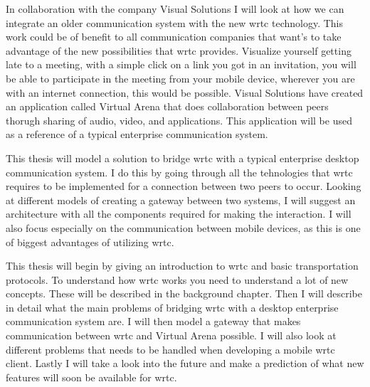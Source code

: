 In collaboration with the company Visual Solutions I will look at how we can integrate an older communication system with the new \gls{wrtc} technology. This work could be of benefit to all communication companies that want's to take advantage of the new possibilities that \gls{wrtc} provides. Visualize yourself getting late to a meeting, with a simple click on a link you got in an invitation, you will be able to participate in the meeting from your mobile device, wherever you are with an internet connection, this would be possible. Visual Solutions have created an application called Virtual Arena that does collaboration between peers thorugh sharing of audio, video, and applications. This application will be used as a reference of a typical enterprise communication system.

This thesis will model a solution to bridge \gls{wrtc} with a typical enterprise desktop communication system. I do this by going through all the tehnologies that \gls{wrtc} requires to be implemented for a connection between two peers to occur. Looking at different models of creating a gateway between two systems, I will suggest an architecture with all the components required for making the interaction. I will also focus especially on the communication between mobile devices, as this is one of biggest advantages of utilizing \gls{wrtc}.

This thesis will begin by giving an introduction to \gls{wrtc} and basic transportation protocols. To understand how \gls{wrtc} works you need to understand a lot of new concepts. These will be described in the background chapter. Then I will describe in detail what the main problems of bridging \gls{wrtc} with a desktop enterprise communication system are. I will then model a gateway that makes communication between \gls{wrtc} and Virtual Arena possible. I will also look at different problems that needs to be handled when developing a mobile \gls{wrtc} client. Lastly I will take a look into the future and make a prediction of what new features will soon be available for \gls{wrtc}.